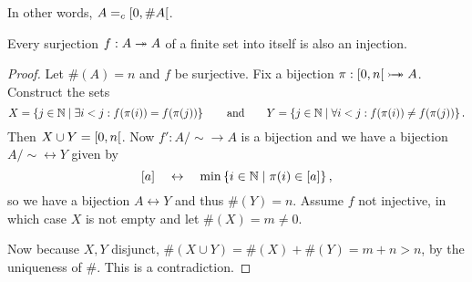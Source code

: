In other words, $A =_c \interval[co]{0,\#A}$.
\begin{corollary}
Every surjection $f:A\twoheadrightarrow A$ of a finite set into itself is also an injection.
\end{corollary}
\begin{proof}
Let $\#(A) = n$ and $f$ be surjective. Fix a bijection $\pi: \interval[co]{0,n} \bij A$. Construct the sets
\[ X = \left\{ j \in \mathbb{N} \;\middle|\; \exists i<j: f(\pi(i)) = f(\pi(j)) \right\}\qquad \text{and}\qquad Y = \left\{ j \in \mathbb{N} \;\middle|\; \forall i<j: f(\pi(i)) \neq f(\pi(j))  \right\}. \]
Then $X\cup Y = \interval[co]{0,n}$. Now $f': A/\sim \to A$ is a bijection and we have a bijection $A/\sim \leftrightarrow Y$ given by
\[ [a] \quad \leftrightarrow \quad \min\left\{ i\in \mathbb{N} \;\middle|\; \pi(i)\in [a] \right\}, \]
so we have a bijection $A\leftrightarrow Y$ and thus $\#(Y) = n$.
Assume $f$ not injective, in which case $X$ is not empty and let $\#(X) = m \neq 0$.

Now because $X,Y$ disjunct, $\#(X\cup Y) = \#(X)+\#(Y) = m+n >n$, by the uniqueness of $\#$. This is a contradiction.
\end{proof}

